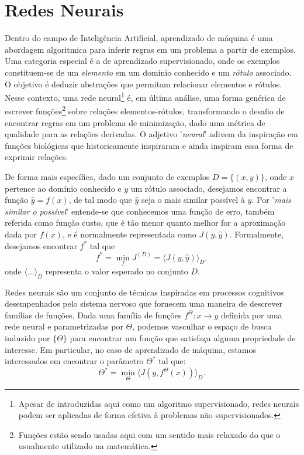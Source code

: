 \section{Redes Neurais} \label{sec:neurais}

Dentro do campo de Inteligência Artificial, aprendizado de máquina é uma abordagem algoritmica para inferir regras em um problema a partir de exemplos. Uma categoria especial é a de aprendizado supervisionado, onde os exemplos constituem-se de um \textit{elemento} em um domínio conhecido e um \textit{rótulo} associado. O objetivo é deduzir abstrações que permitam relacionar elementos e rótulos. Nesse contexto, uma rede neural\footnote{Apesar de introduzidas aqui como um algoritmo supervisionado, redes neurais podem ser aplicadas de forma efetiva à problemas não supervisionados.} é, em última análise, uma forma genérica de escrever funções\footnote{Funções estão sendo usadas aqui com um sentido mais relaxado do que o usualmente utilizado na matemática.} sobre relações elementos-rótulos, transformando o desafio de encontrar regras em um problema de minimização, dado uma métrica de qualidade para as relações derivadas. O adjetivo '\textit{neural}' adivem da inspiração em funções biológicas que historicamente inspiraram e ainda inspiram essa forma de exprimir relações.

De forma mais específica, dado um conjunto de exemplos $D = \{(x, y)\}$, onde $x$  pertence ao domínio conhecido e $y$ um rótulo associado, desejamos encontrar a função $\hat{y} = f(x)$, de tal modo que $\hat{y}$ seja o mais similar possível à $y$. Por '\textit{mais similar o possível}' entende-se que conhecemos uma função de erro, também referida como função custo, que é tão menor quanto melhor for a aproximação dada por $f(x)$, e é normalmente representada como $J(y, \hat{y})$. Formalmente, desejamos encontrar $f^*$ tal que
\begin{equation}
f^* = \min_f J^{(D)} = \langle J(y, \hat{y}) \rangle_{D},
\end{equation}   
onde $\langle \ldots \rangle_{D}$ representa o valor esperado no conjunto $D$.

Redes neurais são um conjunto de técnicas inspiradas em processos cognitivos desempenhados pelo sistema nervoso que fornecem uma maneira de descrever famílias de funções. Dada uma família de funções $f^{\Theta} : x \rightarrow y$ definida por uma rede neural e parametrizadas por $\Theta$, podemos vasculhar o espaço de busca induzido por $\{\Theta\}$ para encontrar um função que satisfaça alguma propriedade de interesse. Em particular, no caso de aprendizado de máquina, estamos interessados em encontrar o parâmetro $\Theta^*$ tal que:
\begin{equation}
\Theta^* = \min_{\Theta} \langle J(y, f^{\Theta}(x)) \rangle_{D}.
\end{equation} 

